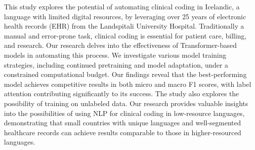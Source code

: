 This study explores the potential of automating clinical coding in Icelandic, a language with limited digital resources, by leveraging over 25 years of electronic health records (EHR) from the Landspitali University Hospital. Traditionally a manual and error-prone task, clinical coding is essential for patient care, billing, and research. Our research delves into the effectiveness of Transformer-based models in automating this process. We investigate various model training strategies, including continued pretraining and model adaptation, under a constrained computational budget. Our findings reveal that the best-performing model achieves competitive results in both micro and macro F1 scores, with label attention contributing significantly to its success. The study also explores the possibility of training on unlabeled data. Our research provides valuable insights into the possibilities of using NLP for clinical coding in low-resource languages, demonstrating that small countries with unique languages and well-segmented healthcare records can achieve results comparable to those in higher-resourced languages.